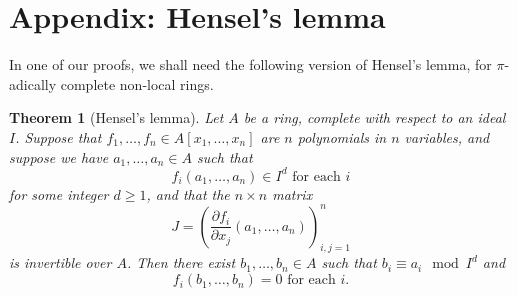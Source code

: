 \documentclass{article}
\theoremstyle{definition}
\theoremstyle{plain}
\newtheorem{thm}[defn]{Theorem}
\theoremstyle{remark}
\begin{document}
	\section{Appendix: Hensel's lemma}
	In one of our proofs, we shall need the following version of Hensel's lemma, for $\pi$-adically complete non-local rings.
	\begin{thm}[Hensel's lemma]\label{Hensel}
		Let $A$ be a ring, complete with respect to an ideal $I$. Suppose that $f_1, \ldots, f_n\in A[x_1, \ldots, x_n]$ are $n$ polynomials in $n$ variables, and suppose we have $a_1, \ldots, a_n\in A$ such that 
		\[f_i(a_1, \ldots, a_n)\in I^d \text{ for each }i\]
		for some integer $d\ge 1$, and that the $n\times n$ matrix
		\[J = \left(\frac{\partial f_i}{\partial x_j}(a_1, \ldots, a_n)\right)_{i,j = 1}^n\]
		is invertible over $A$. Then there exist $b_1, \ldots, b_n\in A$ such that $b_i\equiv a_i \mod I^d$ and 
		\[f_i(b_1, \ldots, b_n) = 0\text{ for each }i.\]
	\end{thm}
\end{document}
